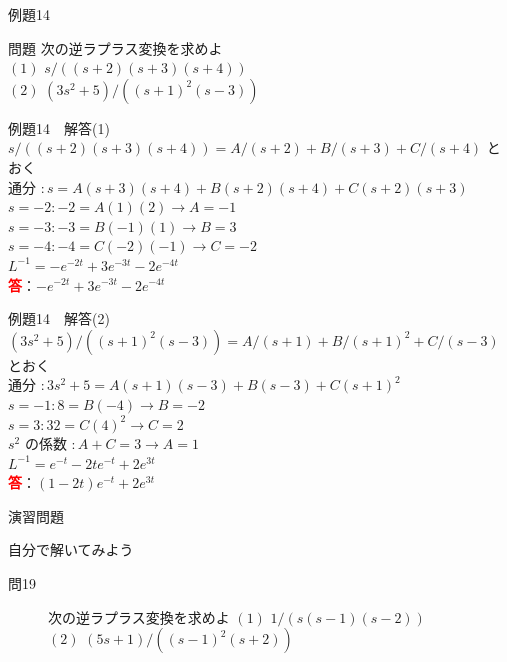 \documentclass[professionalfonts]{beamer}
\begin{document}
\begin{frame}{例題14}
  \begin{exampleblock}{問題}
    次の逆ラプラス変換を求めよ\\[2pt]
    $(1)$ $s/((s+2)(s+3)(s+4))$\\[2pt]
    $(2)$ $(3s^{2}+5) / ((s+1)^{2}(s-3))$\\[2pt]
  \end{exampleblock}
\end{frame}

\begin{frame}{例題14　解答(1)}
  $s/((s+2)(s+3)(s+4)) = A/(s+2) + B/(s+3) + C/(s+4)$ とおく\\[4pt]
  通分 $: s = A(s+3)(s+4) + B(s+2)(s+4) + C(s+2)(s+3)$\\[4pt]
  $s=-2: -2 = A(1)(2) \to A=-1$\\[4pt]
  $s=-3: -3 = B(-1)(1) \to B=3$\\[4pt]
  $s=-4: -4 = C(-2)(-1) \to C=-2$\\[4pt]
  $L^{-1} = -e^{-2t} + 3e^{-3t} - 2e^{-4t}$
  \\[8pt]\textcolor{red}{\textbf{答}}：$-e^{-2t} + 3e^{-3t} - 2e^{-4t}$
\end{frame}

\begin{frame}{例題14　解答(2)}
  $(3s^{2}+5)/((s+1)^{2}(s-3)) = A/(s+1) + B/(s+1)^{2} + C/(s-3)$ とおく\\[4pt]
  通分 $: 3s^{2}+5 = A(s+1)(s-3) + B(s-3) + C(s+1)^{2}$\\[4pt]
  $s=-1: 8 = B(-4) \to B=-2$\\[4pt]
  $s=3: 32 = C(4)^{2} \to C=2$\\[4pt]
  $s^{2}$ の係数 $: A+C=3 \to A=1$\\[4pt]
  $L^{-1} = e^{-t} - 2t e^{-t} + 2e^{3t}$
  \\[8pt]\textcolor{red}{\textbf{答}}：$(1-2t)e^{-t} + 2e^{3t}$
\end{frame}

\begin{frame}{演習問題}
  \begin{exampleblock}{自分で解いてみよう}
  \begin{description}
    \item[問19] 次の逆ラプラス変換を求めよ
    $(1)$ $1/(s(s-1)(s-2))$\\
    $(2)$ $(5s+1)/((s-1)^{2}(s+2))$\\
  \end{description}
  \end{exampleblock}
\end{frame}
\end{document}
